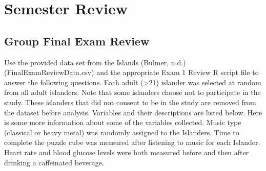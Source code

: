 \documentclass[
]{report}
\begin{document}
\newpage

\hypertarget{semester-review}{%
\chapter{Semester Review}\label{semester-review}}

\hypertarget{group-final-exam-review}{%
\section{Group Final Exam Review}\label{group-final-exam-review}}


Use the provided data set from the Islands (Bulmer, n.d.) (FinalExamReviewData.csv) and the appropriate Exam 1 Review R script file to answer the following questions. Each adult (\textgreater21) islander was selected at random from all adult islanders. Note that some islanders choose not to participate in the study. These islanders that did not consent to be in the study are removed from the dataset before analysis. Variables and their descriptions are listed below. Here is some more information about some of the variables collected. Music type (classical or heavy metal) was randomly assigned to the Islanders. Time to complete the puzzle cube was measured after listening to music for each Islander. Heart rate and blood glucose levels were both measured before and then after drinking a caffeinated beverage.
\end{document}
